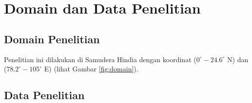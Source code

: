 \vspace{1.5pc}
\section[Domain dan Data Penelitian]{Domain dan Data Penelitian}
\begin{spacing}{1.5}
	\subsection[Domain Penelitian]{Domain Penelitian}
	Penelitian ini dilakukan di Samudera Hindia dengan koordinat ($0^\circ-24.6^\circ$ N) dan ($78.2^\circ-105^\circ$ E) (lihat Gambar \ref{fig:domain}).

	\subsection[Data Penelitian]{Data Penelitian}
%	

\end{spacing}
